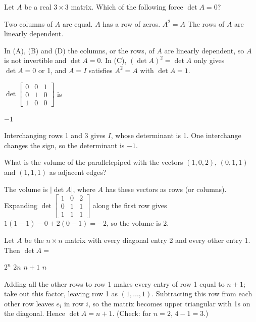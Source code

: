 \begin{question}[id=det-14, type=msq, marks=2]
Let $A$ be a real $3 \times 3$ matrix. Which of the following force $\det A = 0$?
\begin{options}
  \correct Two columns of $A$ are equal.
  \correct $A$ has a row of zeros.
  \option $A^2 = A$
  \correct The rows of $A$ are linearly dependent.
\end{options}
\begin{solution}
In (A), (B) and (D) the columns, or the rows, of $A$ are linearly dependent, so $A$ is not invertible and $\det A = 0$. In (C), $(\det A)^2 = \det A$ only gives $\det A = 0$ or 1, and $A = I$ satisfies $A^2 = A$ with $\det A = 1$.
\end{solution}
\end{question}

\begin{question}[id=det-15]
$\det \begin{bmatrix} 0 & 0 & 1 \\ 0 & 1 & 0 \\ 1 & 0 & 0 \end{bmatrix}$ is
\begin{options}
  \correct $-1$
\end{options}
\begin{solution}
Interchanging rows 1 and 3 gives $I$, whose determinant is 1. One interchange changes the sign, so the determinant is $-1$.
\end{solution}
\end{question}

\begin{question}[id=det-16, marks=2]
What is the volume of the parallelepiped with the vectors $(1, 0, 2)$, $(0, 1, 1)$ and $(1, 1, 1)$ as adjacent edges?
\begin{solution}
The volume is $|\det A|$, where $A$ has these vectors as rows (or columns). Expanding $\det\begin{bmatrix} 1 & 0 & 2 \\ 0 & 1 & 1 \\ 1 & 1 & 1 \end{bmatrix}$ along the first row gives $1(1 - 1) - 0 + 2(0 - 1) = -2$, so the volume is 2.
\end{solution}
\end{question}

\begin{question}[id=det-17, marks=2]
Let $A$ be the $n \times n$ matrix with every diagonal entry 2 and every other entry 1. Then $\det A =$
\begin{options}
  \option $2^n$
  \option $2n$
  \correct $n + 1$
  \option $n$
\end{options}
\begin{solution}
Adding all the other rows to row 1 makes every entry of row 1 equal to $n + 1$; take out this factor, leaving row 1 as $(1, \dots, 1)$. Subtracting this row from each other row leaves $e_i$ in row $i$, so the matrix becomes upper triangular with 1s on the diagonal. Hence $\det A = n + 1$. (Check: for $n = 2$, $4 - 1 = 3$.)
\end{solution}
\end{question}

